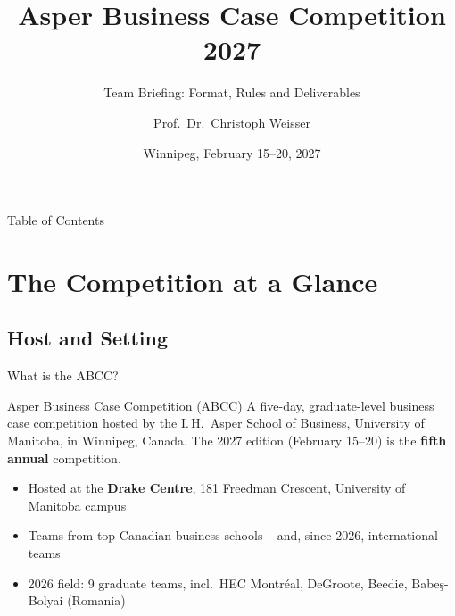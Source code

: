 \documentclass[aspectratio=169,11pt]{beamer}
\title{Asper Business Case Competition 2027}
\subtitle{Team Briefing: Format, Rules and Deliverables}
\author{Prof.\ Dr.\ Christoph Weisser}
\institute{HSBI}
\date{Winnipeg, February 15--20, 2027}
\begin{document}

\begin{frame}
  \titlepage
\end{frame}

\begin{frame}{Table of Contents}
  \tableofcontents[hideallsubsections]
\end{frame}


\section{The Competition at a Glance}

\subsection{Host and Setting}

\begin{frame}{What is the ABCC?}
  \begin{block}{Asper Business Case Competition (ABCC)}
    A five-day, graduate-level business case competition hosted by the
    I.\,H.~Asper School of Business, University of Manitoba, in
    Winnipeg, Canada. The 2027 edition (February 15--20) is the
    \textbf{fifth annual} competition.
  \end{block}
  \begin{itemize}
    \item Hosted at the \textbf{Drake Centre}, 181 Freedman Crescent, University of Manitoba campus
    \item Teams from top Canadian business schools -- and, since 2026, international teams
    \item 2026 field: 9 graduate teams, incl.\ HEC Montr\'eal, DeGroote, Beedie, Babe\c{s}-Bolyai (Romania)
  \end{itemize}
\end{frame}
\end{document}
